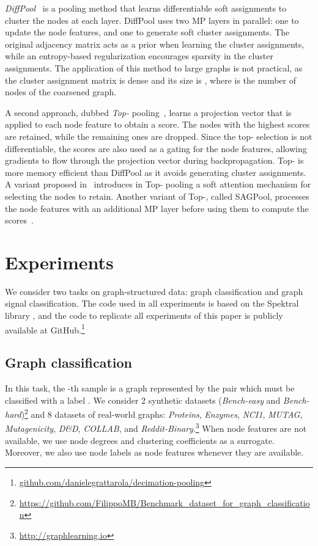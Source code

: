 \documentclass[journal]{IEEEtran}
\begin{document}
\textit{DiffPool}~\cite{ying2018hierarchical} is a pooling method that learns differentiable soft assignments to cluster the nodes at each layer. 
DiffPool uses two MP layers in parallel: one to update the node features, and one to generate soft cluster assignments.
The original adjacency matrix acts as a prior when learning the cluster assignments, while an entropy-based regularization encourages sparsity in the cluster assignments.
The application of this method to large graphs is not practical, as the cluster assignment matrix is dense and its size is , where  is the number of nodes of the coarsened graph.

A second approach, dubbed \textit{Top-} pooling~\cite{graphunet, cangea2018towards}, learns a projection vector that is applied to each node feature to obtain a score. 
The nodes with the  highest scores are retained, while the remaining ones are dropped.
Since the top- selection is not differentiable, the scores are also used as a gating for the node features, allowing gradients to flow through the projection vector during backpropagation.
Top- is more memory efficient than DiffPool as it avoids generating cluster assignments. 
A variant proposed in~\cite{knyazev2019understanding} introduces in Top- pooling a soft attention mechanism for selecting the nodes to retain.
Another variant of Top-, called SAGPool, processes the node features with an additional MP layer before using them to compute the scores~\cite{pmlr-v97-lee19c}.



\section{Experiments}
\label{sec:experiments}

We consider two tasks on graph-structured data: graph classification and graph signal classification.
The code used in all experiments is based on the Spektral library \cite{grattarola2020graph}, and the code to replicate all experiments of this paper is publicly available at GitHub.\footnote{\url{github.com/danielegrattarola/decimation-pooling}}

\subsection{Graph classification}
In this task, the -th sample is a graph represented by the pair  which must be classified with a label .
We consider 2 synthetic datasets (\textit{Bench-easy} and \textit{Bench-hard})\footnote{\url{https://github.com/FilippoMB/Benchmark_dataset_for_graph_classification}} and 8 datasets of real-world graphs: \textit{Proteins}, \textit{Enzymes}, \textit{NCI1}, \textit{MUTAG}, \textit{Mutagenicity}, \textit{D\&D}, \textit{COLLAB}, and \textit{Reddit-Binary}.\footnote{\url{http://graphlearning.io}}
When node features  are not available, we use node degrees and clustering coefficients as a surrogate.
Moreover, we also use node labels as node features whenever they are available.
\end{document}
